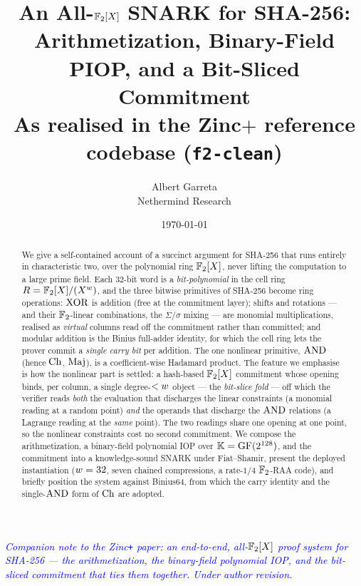 \documentclass[11pt]{article}
\title{An All-$\mathbb{F}_2[X]$ SNARK for SHA-256:\\
       Arithmetization, Binary-Field PIOP, and a Bit-Sliced Commitment\\[4pt]
       \large As realised in the Zinc\texorpdfstring{$+$}{+} reference
       codebase (\texttt{f2-clean})}
\author{Albert Garreta \\[2pt] \normalsize Nethermind Research}
\date{\today}
\begin{document}
\maketitle

\begin{center}
\textcolor{blue}{\textit{Companion note to the Zinc\texttt{+} paper: an
end-to-end, all-$\mathbb{F}_2[X]$ proof system for SHA-256 --- the arithmetization,
the binary-field polynomial IOP, and the bit-sliced commitment that ties
them together. Under author revision.}}
\end{center}
\vspace{0.5em}

\begin{abstract}
We give a self-contained account of a succinct argument for SHA-256 that runs
entirely in characteristic two, over the polynomial ring $\mathbb{F}_2[X]$, never
lifting the computation to a large prime field. Each $32$-bit word is a
\emph{bit-polynomial} in the cell ring $R = \mathbb{F}_2[X]/(X^{w})$, and
the three bitwise primitives of SHA-256 become ring operations: $\operatorname{XOR}$ is
addition (free at the commitment layer); shifts and rotations --- and their
$\mathbb{F}_2$-linear combinations, the $\Sigma/\sigma$ mixing --- are monomial
multiplications, realised as \emph{virtual} columns read off the commitment
rather than committed; and modular addition is the Binius full-adder identity,
for which the cell ring lets the prover commit a \emph{single carry bit} per
addition. The one nonlinear primitive, $\operatorname{AND}$ (hence $\operatorname{Ch}$, $\operatorname{Maj}$), is a
coefficient-wise Hadamard product. The feature we emphasise is how the
nonlinear part is settled: a hash-based $\mathbb{F}_2[X]$ commitment whose opening
binds, per column, a single degree-$<w$ object --- the \emph{bit-slice
fold} --- off which the verifier reads \emph{both} the evaluation that
discharges the linear constraints (a monomial reading at a random point)
\emph{and} the operands that discharge the $\operatorname{AND}$ relations (a Lagrange reading
at the \emph{same} point). The two readings share one opening at one point, so
the nonlinear constraints cost no second commitment. We compose the
arithmetization, a binary-field polynomial IOP over $\mathbb{K} = \mathrm{GF}(2^{128})$,
and the commitment into a knowledge-sound SNARK under Fiat--Shamir, present the
deployed instantiation ($w = 32$, seven chained compressions, a rate-$1/4$
$\mathbb{F}_2$-RAA code), and briefly position the system against Binius64, from which
the carry identity and the single-$\operatorname{AND}$ form of $\operatorname{Ch}$ are adopted.
\end{abstract}

\tableofcontents












\appendix



\end{document}
